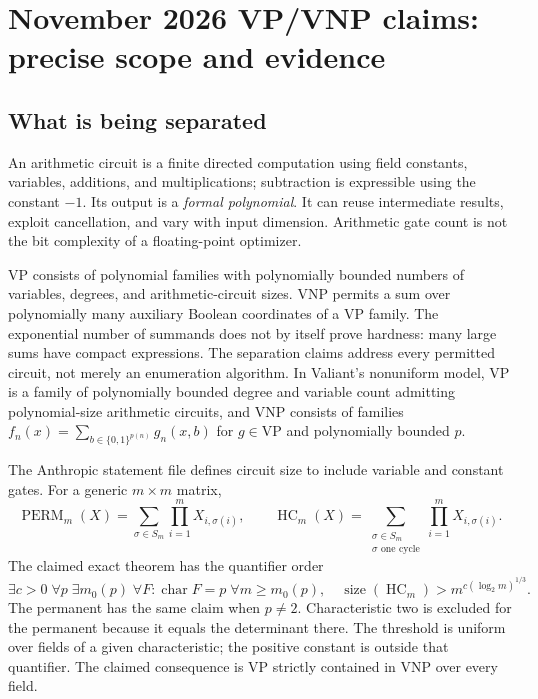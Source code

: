 \documentclass[11pt,letterpaper]{article}
\begin{document}
\section{November 2026 VP/VNP claims: precise scope and evidence}
\label{sec:vp}
\subsection{What is being separated}
An arithmetic circuit is a finite directed computation using field constants, variables, additions, and multiplications; subtraction is expressible using the constant $-1$. Its output is a \emph{formal polynomial}. It can reuse intermediate results, exploit cancellation, and vary with input dimension. Arithmetic gate count is not the bit complexity of a floating-point optimizer.

VP consists of polynomial families with polynomially bounded numbers of variables, degrees, and arithmetic-circuit sizes. VNP permits a sum over polynomially many auxiliary Boolean coordinates of a VP family. The exponential number of summands does not by itself prove hardness: many large sums have compact expressions. The separation claims address every permitted circuit, not merely an enumeration algorithm. In Valiant's nonuniform model, VP is a family of polynomially bounded degree and variable count admitting polynomial-size arithmetic circuits, and VNP consists of families $f_n(x)=\sum_{b\in\{0,1\}^{p(n)}}g_n(x,b)$ for $g\in\mathrm{VP}$ and polynomially bounded $p$.\cite{valiant}

The Anthropic statement file defines circuit size to include variable and constant gates. For a generic $m\times m$ matrix,
\[
 \operatorname{PERM}_m(X)=\sum_{\sigma\in S_m}\prod_{i=1}^m X_{i,\sigma(i)},\qquad
 \operatorname{HC}_m(X)=\sum_{\substack{\sigma\in S_m\\\sigma\text{ one cycle}}}\prod_{i=1}^m X_{i,\sigma(i)}.
\]
The claimed exact theorem has the quantifier order
\begin{equation}
 \exists c>0\;\forall p\;\exists m_0(p)\;\forall F:\operatorname{char}F=p\;
 \forall m\ge m_0(p),\quad
 \operatorname{size}(\operatorname{HC}_m)>m^{c(\log_2m)^{1/3}} .
 \label{eq:vp}
\end{equation}
The permanent has the same claim when $p\ne2$. Characteristic two is excluded for the permanent because it equals the determinant there. The threshold is uniform over fields of a given characteristic; the positive constant is outside that quantifier. The claimed consequence is VP strictly contained in VNP over every field.\cite{anthropicstatement}
\end{document}
